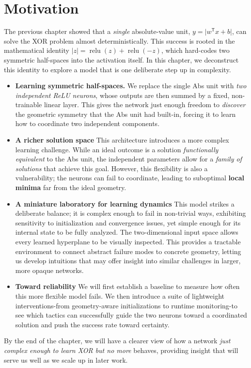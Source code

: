 \section{Motivation}
\label{sec:relu1-motivation}

The previous chapter showed that a \emph{single} absolute-value unit, \(y=\lvert w^{\mathsf T} x + b\rvert\), can solve the XOR problem almost deterministically. This success is rooted in the mathematical identity \(\lvert z\rvert=\operatorname{relu}(z)+\operatorname{relu}(-z)\), which hard-codes two symmetric half-spaces into the activation itself. In this chapter, we deconstruct this identity to explore a model that is one deliberate step up in complexity.

\begin{itemize}
    \item \textbf{Learning symmetric half-spaces.}
        We replace the single Abs unit with \emph{two independent ReLU neurons}, whose outputs are then summed by a fixed, non-trainable linear layer. This gives the network just enough freedom to \emph{discover} the geometric symmetry that the Abs unit had built-in, forcing it to learn how to coordinate two independent components.

    \item \textbf{A richer solution space}
        This architecture introduces a more complex learning challenge. While an ideal outcome is a solution \emph{functionally equivalent} to the Abs unit, the independent parameters allow for a \emph{family of solutions} that achieve this goal. However, this flexibility is also a vulnerability; the neurons can fail to coordinate, leading to suboptimal \textbf{local minima} far from the ideal geometry.

    \item \textbf{A miniature laboratory for learning dynamics}
        This model strikes a deliberate balance; it is complex enough to fail in non-trivial ways, exhibiting sensitivity to initialization and convergence issues, yet simple enough for its internal state to be fully analyzed. The two-dimensional input space allows every learned hyperplane to be visually inspected. This provides a tractable environment to connect abstract failure modes to concrete geometry, letting us develop intuitions that may offer insight into similar challenges in larger, more opaque networks.
    \item \textbf{Toward reliability}
        We will first establish a baseline to measure how often this more flexible model fails. We then introduce a suite of lightweight interventions-from geometry-aware initializations to runtime monitoring-to see which tactics can successfully guide the two neurons toward a coordinated solution and push the success rate toward certainty.
\end{itemize}

By the end of the chapter, we will have a clearer view of how a network \emph{just complex enough to learn XOR but no more} behaves, providing insight that will serve us well as we scale up in later work.